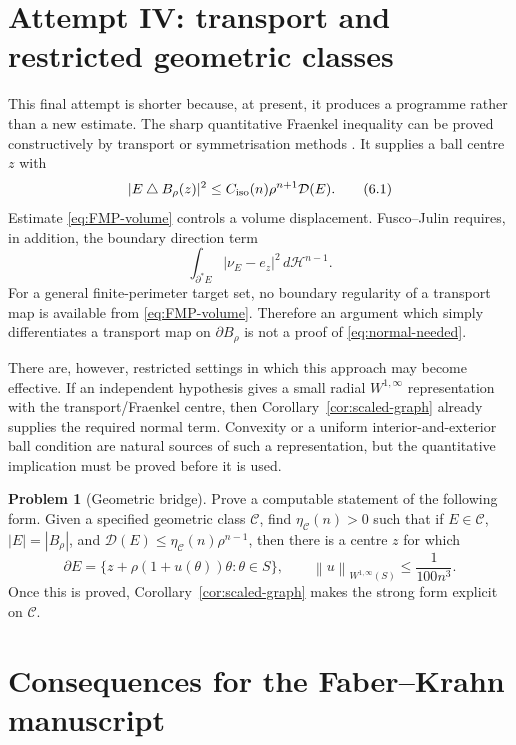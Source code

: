 \documentclass[11pt]{amsart}
\theoremstyle{definition}
\newtheorem{problem}[theorem]{Problem}
\newcommand{\Hn}{\mathcal H^{n-1}}
\newcommand{\norm}[1]{\left\|#1\right\|}
\newcommand{\Def}{\mathcal D}
\begin{document}
\section{Attempt IV: transport and restricted geometric classes}
\label{sec:transport}

This final attempt is shorter because, at present, it produces a programme
rather than a new estimate.  The sharp quantitative Fraenkel inequality can
be proved constructively by transport or symmetrisation methods
\cite{FMP}.  It supplies a ball centre \(z\) with
\[
   |E\mathbin{\triangle}B_\rho(z)|^2
   \le C_{\rm iso}(n)\rho^{n+1}\Def(E).
\tag{6.1}\label{eq:FMP-volume}
\]
Estimate \eqref{eq:FMP-volume} controls a volume displacement.  Fusco--Julin
requires, in addition, the boundary direction term
\[
   \int_{\partial^*E}|\nu_E-e_z|^2\,d\Hn.
\tag{6.2}\label{eq:normal-needed}
\]
For a general finite-perimeter target set, no boundary regularity of a
transport map is available from \eqref{eq:FMP-volume}.  Therefore an argument
which simply differentiates a transport map on \(\partial B_\rho\) is not a
proof of \eqref{eq:normal-needed}.

There are, however, restricted settings in which this approach may become
effective.  If an independent hypothesis gives a small radial
\(W^{1,\infty}\) representation with the transport/Fraenkel centre, then
Corollary~\ref{cor:scaled-graph} already supplies the required normal term.
Convexity or a uniform interior-and-exterior ball condition are natural
sources of such a representation, but the quantitative implication must be
proved before it is used.

\begin{problem}[Geometric bridge]\label{prob:bridge}
Prove a computable statement of the following form.  Given a specified
geometric class \(\mathcal C\), find \(\eta_{\mathcal C}(n)>0\) such that if
\(E\in\mathcal C\), \(|E|=|B_\rho|\), and
\(\Def(E)\le\eta_{\mathcal C}(n)\rho^{n-1}\), then there is a centre \(z\)
for which
\[
   \partial E=\{z+\rho(1+u(\theta))\theta:\theta\in S\},
   \qquad
   \norm{u}_{W^{1,\infty}(S)}\le\frac1{100n^3}.
\]
Once this is proved, Corollary~\ref{cor:scaled-graph} makes the strong form
explicit on \(\mathcal C\).
\end{problem}

\section{Consequences for the Faber--Krahn manuscript}\label{sec:application}
\end{document}
